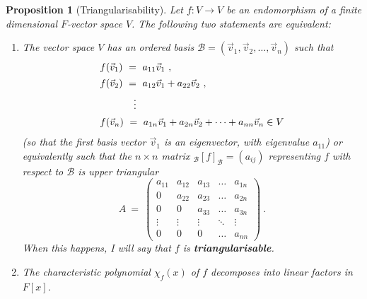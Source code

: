 \documentclass[11pt]{amsbook}
\newtheorem{proposition}[theorem]{Proposition}
\theoremstyle{definition}
\begin{document}
\begin{proposition} [Triangularisability] \label{triendo} Let $f:V\to V$ be an endomorphism of a finite dimensional $F$-vector space $V$. The following two statements are equivalent:
\begin{enumerate}
\item The vector space $V$ has an ordered basis $\mathcal{B}=(\vec{v}_1,\vec{v}_2,\dots,\vec{v}_n)$ such that
$$\begin{array}{l}
f(\vec{v}_1)~=~a_{11}\vec{v}_1~,\\[1ex]
f(\vec{v}_2)~=~a_{12}\vec{v}_1+a_{22}\vec{v}_2~,\\[1ex]
\hskip12mm \vdots \\[1ex]
f(\vec{v}_n)~=~a_{1n}\vec{v}_1+a_{2n}\vec{v}_2+\dots+a_{nn}\vec{v}_n \in V
\end{array}
$$
(so that the first basis vector $\vec{v}_1$ is an eigenvector, with eigenvalue $a_{11}$) or
equivalently such that the $n \times n$ matrix   ${}_{\mathcal{B}}[f]_{\mathcal{B}}=(a_{ij})$ representing $f$ with respect to $\mathcal{B}$ is upper triangular
$$A~=~\begin{pmatrix} a_{11} & a_{12} & a_{13} & \dots & a_{1n}\\
0 & a_{22} & a_{23} & \dots & a_{2n}\\
0 & 0 & a_{33} & \dots & a_{3n}\\
\vdots & \vdots & \vdots & \ddots & \vdots \\
0 & 0 & 0 &  \dots & a_{nn} \end{pmatrix}~.
$$
When this happens, I will say that $f$ is {\bf triangularisable}.
\item The characteristic polynomial $\chi_f(x)$ of $f$ decomposes into linear factors in $F[x]$.
\end{enumerate}
\end{proposition}
\end{document}
